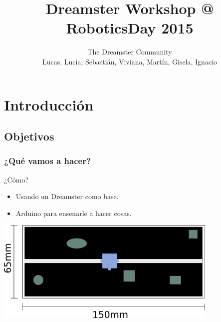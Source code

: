 \documentclass[compress]{beamer}
\title[Dreamster Workshop]{Dreamster Workshop @ RoboticsDay 2015}
\author[Robotics Day]
{
The Dreamster Community \\
Lucas, Lucía, Sebastián, Viviana, Martín, Gisela, Ignacio
}
\begin{document}
\frame{\titlepage}

\section{Introducción}
\subsection{Objetivos}

\begin{frame}
 \frametitle{¿Qué vamos a hacer?}

\begin{center}
\end{center}

\begin{block}{¿Cómo?}
\begin{itemize}
 \item Usando un Dreamster como base.
 \item Arduino para ensenarle a hacer cosas.
\end{itemize}
\end{block}

\begin{center}
\includegraphics[width=0.8\textwidth]{./img/desk.png} 
\end{center}

\end{frame}
 
\end{document}
